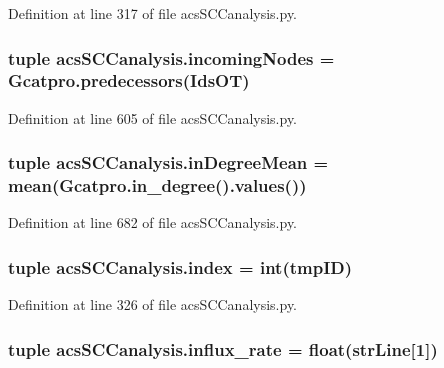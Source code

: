 Definition at line 317 of file acs\-S\-C\-Canalysis.\-py.

\hypertarget{a00102_a540ba5319ee67d8a2323099dad73ba36}{
\subsubsection[{incoming\-Nodes}]{\setlength{\rightskip}{0pt plus 5cm}tuple acs\-S\-C\-Canalysis.\-incoming\-Nodes = Gcatpro.\-predecessors(Ids\-O\-T)}}\label{a00102_a540ba5319ee67d8a2323099dad73ba36}


Definition at line 605 of file acs\-S\-C\-Canalysis.\-py.

\hypertarget{a00102_a5004d18b8cfa2803620a9cd7f32d9775}{
\subsubsection[{in\-Degree\-Mean}]{\setlength{\rightskip}{0pt plus 5cm}tuple acs\-S\-C\-Canalysis.\-in\-Degree\-Mean = mean(Gcatpro.\-in\-\_\-degree().values())}}\label{a00102_a5004d18b8cfa2803620a9cd7f32d9775}


Definition at line 682 of file acs\-S\-C\-Canalysis.\-py.

\hypertarget{a00102_aaac3bb67a998c4a09aeed8f1adec2f9c}{
\subsubsection[{index}]{\setlength{\rightskip}{0pt plus 5cm}tuple acs\-S\-C\-Canalysis.\-index = int(tmp\-I\-D)}}\label{a00102_aaac3bb67a998c4a09aeed8f1adec2f9c}


Definition at line 326 of file acs\-S\-C\-Canalysis.\-py.

\hypertarget{a00102_a3a8adee26325d72aca909e91b0fd3ea5}{
\subsubsection[{influx\-\_\-rate}]{\setlength{\rightskip}{0pt plus 5cm}tuple acs\-S\-C\-Canalysis.\-influx\-\_\-rate = float({\bf str\-Line}\mbox{[}1\mbox{]})}}\label{a00102_a3a8adee26325d72aca909e91b0fd3ea5}


